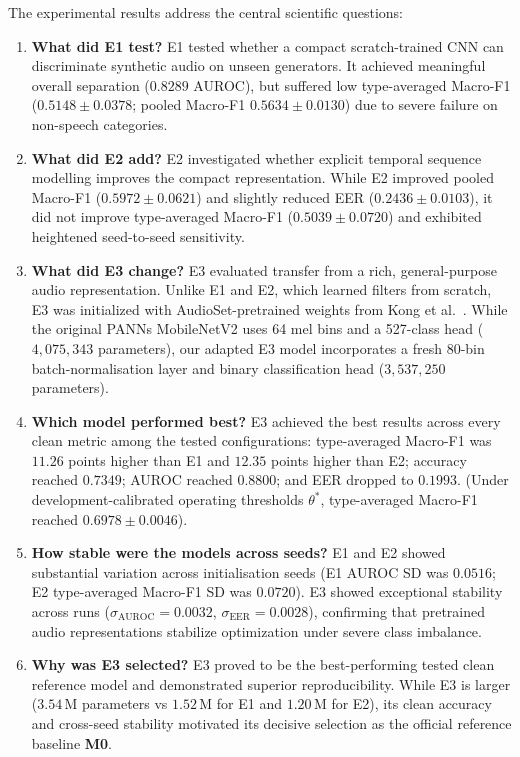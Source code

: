 The experimental results address the central scientific questions:
\begin{enumerate}[label=\textbf{\arabic*.},leftmargin=*,itemsep=0.2em]
  \item \textbf{What did E1 test?} E1 tested whether a compact scratch-trained CNN can discriminate synthetic audio on unseen generators. It achieved meaningful overall separation ($0.8289$ AUROC), but suffered low type-averaged Macro-F1 ($0.5148 \pm 0.0378$; pooled Macro-F1 $0.5634 \pm 0.0130$) due to severe failure on non-speech categories.
  \item \textbf{What did E2 add?} E2 investigated whether explicit temporal sequence modelling improves the compact representation. While E2 improved pooled Macro-F1 ($0.5972 \pm 0.0621$) and slightly reduced EER ($0.2436 \pm 0.0103$), it did not improve type-averaged Macro-F1 ($0.5039 \pm 0.0720$) and exhibited heightened seed-to-seed sensitivity.
  \item \textbf{What did E3 change?} E3 evaluated transfer from a rich, general-purpose audio representation. Unlike E1 and E2, which learned filters from scratch, E3 was initialized with AudioSet-pretrained weights from Kong et al.~\cite{kong2020panns}. While the original PANNs MobileNetV2 uses 64 mel bins and a 527-class head ($4{,}075{,}343$ parameters), our adapted E3 model incorporates a fresh 80-bin batch-normalisation layer and binary classification head ($3{,}537{,}250$ parameters).
  \item \textbf{Which model performed best?} E3 achieved the best results across every clean metric among the tested configurations: type-averaged Macro-F1 was $11.26$ points higher than E1 and $12.35$ points higher than E2; accuracy reached $0.7349$; AUROC reached $0.8800$; and EER dropped to $0.1993$. (Under development-calibrated operating thresholds $\theta^*$, type-averaged Macro-F1 reached $0.6978 \pm 0.0046$).
  \item \textbf{How stable were the models across seeds?} E1 and E2 showed substantial variation across initialisation seeds (E1 AUROC SD was $0.0516$; E2 type-averaged Macro-F1 SD was $0.0720$). E3 showed exceptional stability across runs ($\sigma_{\mathrm{AUROC}} = 0.0032$, $\sigma_{\mathrm{EER}} = 0.0028$), confirming that pretrained audio representations stabilize optimization under severe class imbalance.
  \item \textbf{Why was E3 selected?} E3 proved to be the best-performing tested clean reference model and demonstrated superior reproducibility. While E3 is larger ($3.54$\,M parameters vs $1.52$\,M for E1 and $1.20$\,M for E2), its clean accuracy and cross-seed stability motivated its decisive selection as the official reference baseline \textbf{M0}.
\end{enumerate}

